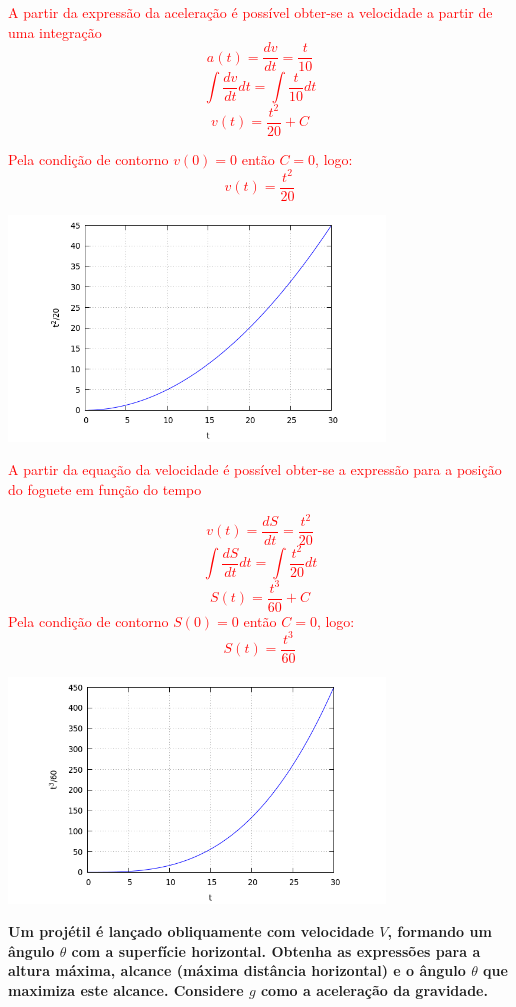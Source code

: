\documentclass[
    12pt, %
    openright,
    twoside, %
    a4paper, %
    article,
    english,brazil %
]{abntex2}
\begin{document}
\textcolor{red}{A partir da expressão da aceleração é possível obter-se a velocidade a partir de uma integração}
\textcolor{red}{
    $$a(t) = \frac{dv}{dt} = \frac{t}{10}$$
    $$\int \frac{dv}{dt} dt = \int \frac{t}{10} dt $$
    $$v(t) = \frac{t^2}{20} + C $$
}

\textcolor{red}{Pela condição de contorno $v(0) = 0$ então $C = 0$, logo:}
\textcolor{red}{
    $$v(t) = \frac{t^2}{20} $$
}

\includegraphics[width=\linewidth,height=6cm,keepaspectratio,]{./fig/exerc01-01.png}

\textcolor{red}{A partir da equação da velocidade é possível obter-se a expressão para a posição do foguete em função do tempo}

\textcolor{red}{
    $$v(t) = \frac{dS}{dt} = \frac{t^2}{20} $$
    $$\int \frac{dS}{dt} dt = \int \frac{t^2}{20} dt$$
    $$S(t) = \frac{t^3}{60} + C $$
}
\textcolor{red}{Pela condição de contorno $S(0) = 0$ então $C = 0$, logo:}
\textcolor{red}{
    $$S(t) = \frac{t^3}{60} $$
}

\includegraphics[width=\linewidth,height=6cm,keepaspectratio,]{./fig/exerc01-02.png}

\textbf{Um projétil é lançado obliquamente com velocidade $V$, formando um ângulo $\theta$ com a superfície horizontal. Obtenha as expressões para a altura máxima, alcance (máxima distância horizontal) e o ângulo $\theta$ que maximiza este alcance. Considere $g$ como a aceleração da gravidade.}
\end{document}
